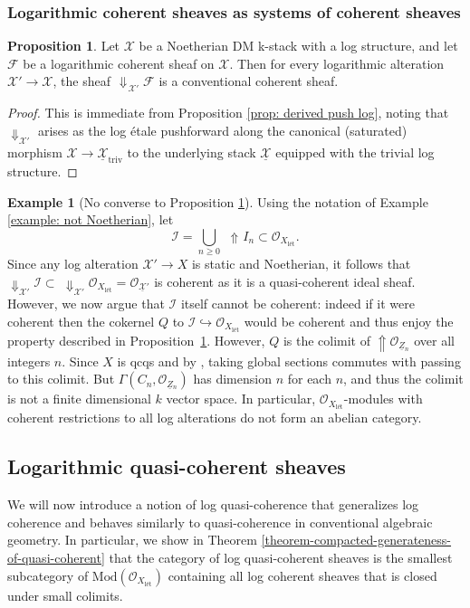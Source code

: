 \documentclass[11pt]{amsart}
\theoremstyle{definition}
\theoremstyle{definition}
\newtheorem{proposition}[theorem]{Proposition}
\newtheorem{example}[theorem]{Example}
\DeclareMathOperator{\arrowup}{\!\Uparrow \!}
\DeclareMathOperator{\arrowdown}{\!\Downarrow\!}
\newcommand{\cI}{\mathcal{I}}
\newcommand{\cO}{\mathcal{O}}
\newcommand{\cX}{\mathcal{X}}
\newcommand{\LogO}[1]{\mathcal{O}_{{#1}_\text{l\'et}}}
\newcommand{\ul}[1]{\underline{#1}}
\newcommand{\cal}{\mathcal}
\def\cO{{\cal O}}
\def\cX{{\cal X}}
\begin{document}
\subsubsection{Logarithmic coherent sheaves as systems of coherent sheaves}
\begin{proposition}\label{prop:DownCohDoesnt Imply Coh}
    Let $\mathcal{X}$ be a Noetherian DM k-stack with a log structure, and let $\mathcal{F}$ be a logarithmic coherent sheaf on $\mathcal{X}$. Then for every logarithmic alteration $\mathcal{X'}\rightarrow \mathcal{X}$, the sheaf $\arrowdown_{\cX'} \mathcal{F}$ is a conventional coherent sheaf.
\end{proposition}
\begin{proof}
    This is immediate from Proposition \ref{prop: derived push log}, noting that $\Downarrow_{\cX'}$ arises as the log \'etale pushforward along the canonical (saturated) morphism $\cX\rightarrow \ul{\cX}_{\text{triv}}$ to the underlying stack $\ul{\mathcal{X}}$ equipped with the trivial log structure.
\end{proof}
\begin{example}[No converse to Proposition \ref{prop:DownCohDoesnt Imply Coh}]
    Using the notation of Example \ref{example: not Noetherian}, let $$\cI= \bigcup_{n\geq 0}\; \arrowup I_n\subset \cO_{X_{\text{l\'et}}}.$$ Since any log alteration $\cX'\rightarrow X$ is static and Noetherian, it follows that $\Downarrow_{\cX'} \!\! \cI \subset \;\Downarrow_{\cX'}\!\LogO{X} = \cO_{\ul{\cX}'}$ %
    is coherent as it is a quasi-coherent ideal sheaf. However, we now argue that $\cI$ itself cannot be coherent: indeed if it were coherent then the cokernel $Q$ to $\mathcal{I}\hookrightarrow \LogO{X}$ would be coherent and thus enjoy the property described in Proposition~\ref{prop:DownCohDoesnt Imply Coh}. However, $Q$ is the colimit of $\Uparrow \!\! \!\mathcal{O}_{\underline{Z}{}_n}$ over all integers $n$. Since $X$ is qcqs and by \cite[0738]{stacks}, taking global sections commutes with passing to this colimit. But $\Gamma(C_n,\mathcal{O}_{\underline{Z}{}_n})$ has dimension $n$ for each $n$, and thus the colimit is not a finite dimensional $k$ vector space. In particular, $\LogO{X}$-modules with coherent restrictions to all log alterations do not form an abelian category. 
\end{example}

\subsection{Logarithmic quasi-coherent sheaves}\label{subsection on log quasi-coherent sheaves}
We will now introduce a notion of log quasi-coherence that generalizes log coherence and behaves similarly to quasi-coherence in conventional algebraic geometry. In particular, we show in Theorem \ref{theorem-compacted-generateness-of-quasi-coherent} that the category of log quasi-coherent sheaves is the smallest subcategory of $\text{Mod}(\LogO{X})$ containing all log coherent sheaves that is closed under small colimits.
\end{document}
